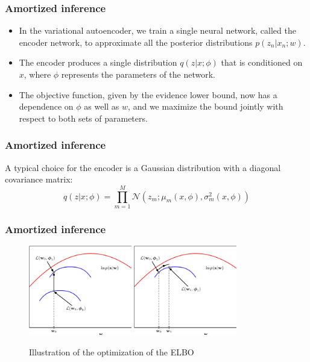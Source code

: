 \documentclass{beamer}
\begin{document}
\begin{frame}
    \frametitle{Amortized inference}
    \begin{itemize}
        \item In the variational autoencoder, we train a single neural network, called the encoder network, to approximate all the posterior distributions $p(z_{n}|x_{n};w)$.
        \item The encoder produces a single distribution $q(z|x;\phi)$ that is conditioned on $x$, where $\phi$ represents the parameters of the network.
        \item The objective function, given by the evidence lower bound, now has a dependence on $\phi$ as well as $w$, and we maximize the bound jointly with respect to both sets of parameters.
    \end{itemize}
\end{frame}

\begin{frame}
    \frametitle{Amortized inference}
    A typical choice for the encoder is a Gaussian distribution with a diagonal covariance matrix:
    \begin{equation*}
        q(z|x;\phi)=\prod_{m=1}^{M}\mathcal{N}(z_{m};\mu_{m}(x,\phi),\sigma^{2}_{m}(x,\phi))
    \end{equation*}
\end{frame}

\begin{frame}
    \frametitle{Amortized inference}
    \begin{figure}
        \caption{Illustration of the optimization of the ELBO}
        \includegraphics[width=0.4\textwidth]{Figure_8_a.pdf}
        \includegraphics[width=0.4\textwidth]{Figure_8_b.pdf}
    \end{figure}
\end{frame}
\end{document}

